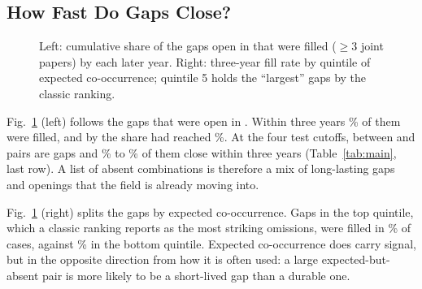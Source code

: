 \documentclass[runningheads]{llncs}
\begin{document}
\subsection{How Fast Do Gaps Close?}

\begin{figure}[t]
\centering
{}
\caption{Left: cumulative share of the \survGaps{} gaps open in \survT{} that were filled ($\ge3$ joint papers) by each later year. Right: three-year fill rate by quintile of expected co-occurrence; quintile 5 holds the ``largest'' gaps by the classic ranking.}
\label{fig:survival}
\end{figure}

Fig.~\ref{fig:survival} (left) follows the \survGaps{} gaps that were open in \survT{}. Within three years \survThree{}\% of them were filled, and by \survLastYear{} the share had reached \survLast{}\%. At the four test cutoffs, between \minGaps{} and \maxGaps{} pairs are gaps and \fillMin{}\% to \fillMax{}\% of them close within three years (Table~\ref{tab:main}, last row). A list of absent combinations is therefore a mix of long-lasting gaps and openings that the field is already moving into.

Fig.~\ref{fig:survival} (right) splits the gaps by expected co-occurrence. Gaps in the top quintile, which a classic ranking reports as the most striking omissions, were filled in \fillQhigh{}\% of cases, against \fillQlow{}\% in the bottom quintile. Expected co-occurrence does carry signal, but in the opposite direction from how it is often used: a large expected-but-absent pair is more likely to be a short-lived gap than a durable one.
\end{document}
